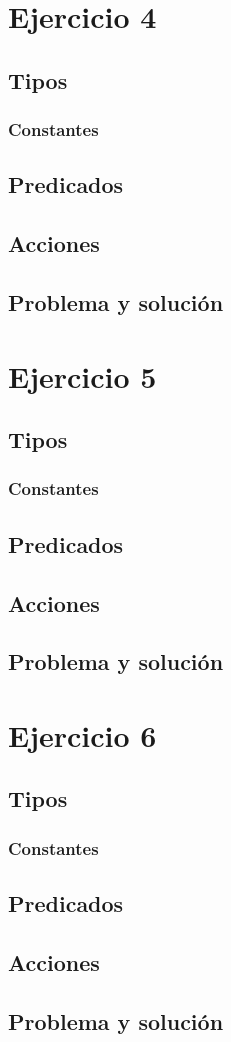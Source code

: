 \section{Ejercicio 4}

\subsection{Tipos}
\subsubsection{Constantes}
\subsection{Predicados}
\subsection{Acciones}
\subsection{Problema y solución}

\section{Ejercicio 5}

\subsection{Tipos}
\subsubsection{Constantes}
\subsection{Predicados}
\subsection{Acciones}
\subsection{Problema y solución}

\section{Ejercicio 6}

\subsection{Tipos}
\subsubsection{Constantes}
\subsection{Predicados}
\subsection{Acciones}
\subsection{Problema y solución}
